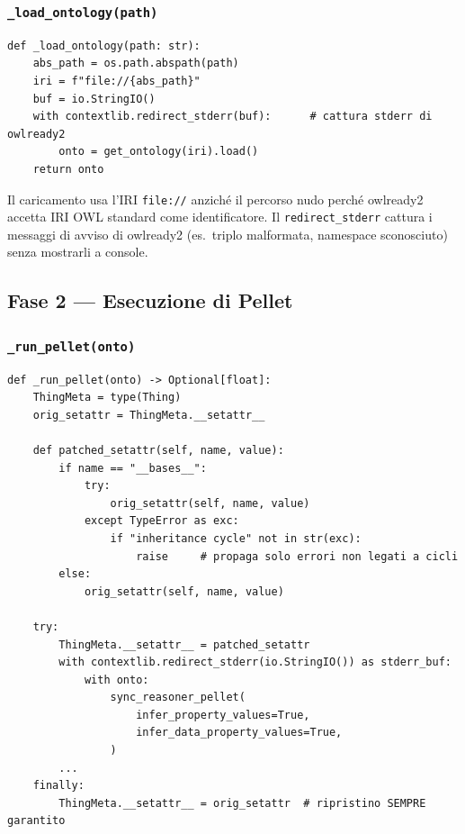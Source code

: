 \documentclass[a4paper,12pt]{article}
\begin{document}
\subsubsection{\texttt{\_load\_ontology(path)}}

\begin{lstlisting}[caption={Caricamento del file RDF in owlready2.}]
def _load_ontology(path: str):
    abs_path = os.path.abspath(path)
    iri = f"file://{abs_path}"
    buf = io.StringIO()
    with contextlib.redirect_stderr(buf):      # cattura stderr di owlready2
        onto = get_ontology(iri).load()
    return onto
\end{lstlisting}

\noindent Il caricamento usa l'IRI \texttt{file://} anzich\'{e} il percorso nudo
perch\'{e} owlready2 accetta IRI OWL standard come identificatore. Il
\texttt{redirect\_stderr} cattura i messaggi di avviso di owlready2
(es.\ triplo malformata, namespace sconosciuto) senza mostrarli a
console.

\subsection{Fase 2 --- Esecuzione di Pellet}

\subsubsection{\texttt{\_run\_pellet(onto)}}

\begin{lstlisting}[caption={Avvio del reasoner Pellet con monkey-patch anti-ciclo.}]
def _run_pellet(onto) -> Optional[float]:
    ThingMeta = type(Thing)
    orig_setattr = ThingMeta.__setattr__

    def patched_setattr(self, name, value):
        if name == "__bases__":
            try:
                orig_setattr(self, name, value)
            except TypeError as exc:
                if "inheritance cycle" not in str(exc):
                    raise     # propaga solo errori non legati a cicli
        else:
            orig_setattr(self, name, value)

    try:
        ThingMeta.__setattr__ = patched_setattr
        with contextlib.redirect_stderr(io.StringIO()) as stderr_buf:
            with onto:
                sync_reasoner_pellet(
                    infer_property_values=True,
                    infer_data_property_values=True,
                )
        ...
    finally:
        ThingMeta.__setattr__ = orig_setattr  # ripristino SEMPRE garantito
\end{lstlisting}
\end{document}
